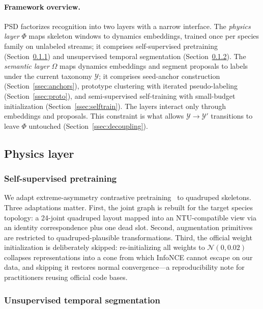 \paragraph{Framework overview.}
PSD factorizes recognition into two layers with a narrow interface. The \emph{physics layer} $\Phi$ maps skeleton windows to dynamics embeddings, trained once per species family on unlabeled streams; it comprises self-supervised pretraining (Section~\ref{ssec:pretrain}) and unsupervised temporal segmentation (Section~\ref{ssec:segmentation}). The \emph{semantic layer} $\Omega$ maps dynamics embeddings and segment proposals to labels under the current taxonomy $\mathcal{Y}$; it comprises seed-anchor construction (Section~\ref{ssec:anchors}), prototype clustering with iterated pseudo-labeling (Section~\ref{ssec:proto}), and semi-supervised self-training with small-budget initialization (Section~\ref{ssec:selftrain}). The layers interact only through embeddings and proposals. This constraint is what allows $\mathcal{Y} \to \mathcal{Y}'$ transitions to leave $\Phi$ untouched (Section~\ref{ssec:decoupling}).

\subsection{Physics layer}\label{ssec:physics}

\subsubsection{Self-supervised pretraining}\label{ssec:pretrain}

We adapt extreme-asymmetry contrastive pretraining~\citep{guo2022aimclr} to quadruped skeletons. Three adaptations matter. First, the joint graph is rebuilt for the target species topology: a 24-joint quadruped layout mapped into an NTU-compatible view via an identity correspondence plus one dead slot. Second, augmentation primitives are restricted to quadruped-plausible transformations. Third, the official weight initialization is deliberately skipped: re-initializing all weights to $\mathcal{N}(0, 0.02)$ collapses representations into a cone from which InfoNCE cannot escape on our data, and skipping it restores normal convergence---a reproducibility note for practitioners reusing official code bases.

\subsubsection{Unsupervised temporal segmentation}\label{ssec:segmentation}

